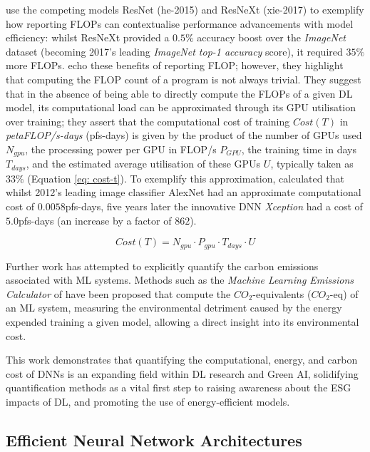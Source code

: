 \documentclass[a4paper, 11pt]{report}
\begin{document}
    \citet{schwartz-2019} use the competing models ResNet (he-2015) and ResNeXt (xie-2017) to exemplify how reporting FLOPs can contextualise performance advancements with model efficiency: whilst ResNeXt provided a $0.5\%$ accuracy boost over the \emph{ImageNet} dataset (becoming 2017's leading \emph{ImageNet top-1 accuracy} score), it required $35\%$ more FLOPs. \citet{amodei-2018} echo these benefits of reporting FLOP; however, they highlight that computing the FLOP count of a program is not always trivial. They suggest that in the absence of being able to directly compute the FLOPs of a given DL model, its computational load can be approximated through its GPU utilisation over training; they assert that the computational cost of training $Cost(T)$ in \emph{petaFLOP/s-days} (pfs-days) is given by the product of the number of GPUs used $N_{gpu}$, the processing power per GPU in FLOP/s $P_{GPU}$, the training time in days $T_{days}$, and the estimated average utilisation of these GPUs $U$, typically taken as $33\%$ (Equation \ref{eq: cost-t}). To exemplify this approximation, \citet{amodei-2018} calculated that whilst 2012's leading image classifier AlexNet \citep{krizhevsky-2012} had an approximate computational cost of $0.0058$pfs-days, five years later the innovative DNN \emph{Xception} \citep{chollet-2017} had a cost of $5.0$pfs-days (an increase by a factor of $862$).

    \begin{equation}
        \label{eq: cost-t}
        Cost(T) = N_{gpu} \cdot P_{gpu} \cdot T_{days} \cdot U
    \end{equation}

    Further work has attempted to explicitly quantify the carbon emissions associated with ML systems. Methods such as the \emph{Machine Learning Emissions Calculator} of \citet{lacoste-2019} have been proposed that compute the $CO_2$-equivalents ($CO_2$-eq) of an ML system, measuring the environmental detriment caused by the energy expended training a given model, allowing a direct insight into its environmental cost.

    This work demonstrates that quantifying the computational, energy, and carbon cost of DNNs is an expanding field within DL research and Green AI, solidifying quantification methods as a vital first step to raising awareness about the ESG impacts of DL, and promoting the use of energy-efficient models.


    \subsection{Efficient Neural Network Architectures}
\end{document}
